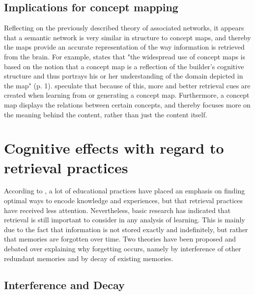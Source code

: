 \subsection{Implications for concept mapping}

Reflecting on the previously described theory of associated networks, it appears that a semantic network is very similar in structure to concept maps, and thereby the maps provide an accurate representation of the way information is retrieved from the brain. For example,  states that "the widespread use of concept maps is based on the notion that a concept map is a reflection of the builder's cognitive structure and thus portrays his or her understanding of the domain depicted in the map" (p. 1).  speculate that because of this, more and better retrieval cues are created when learning from or generating a concept map. Furthermore, a concept map displays the relations between certain concepts, and thereby focuses more on the meaning behind the content, rather than just the content itself.

\section{Cognitive effects with regard to retrieval practices}

According to , a lot of educational practices have placed an emphasis on finding optimal ways to encode knowledge and experiences, but that retrieval practices have received less attention. Nevertheless, basic research has indicated that retrieval is still important to consider in any analysis of learning. This is mainly due to the fact that information is not stored exactly and indefinitely, but rather that memories are forgotten over time. Two theories have been proposed and debated over explaining why forgetting occurs, namely by interference of other redundant memories and by decay of existing memories.

\subsection{Interference and Decay}

\label{subsec:interferencedecay}


